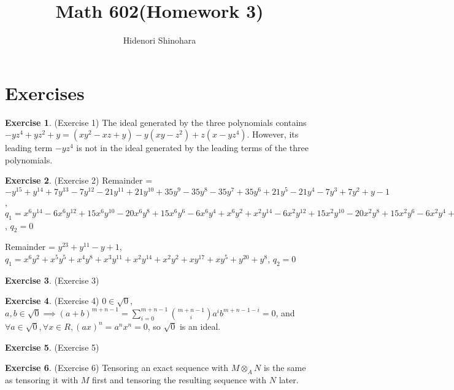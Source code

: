 \documentclass[12pt, psamsfonts]{amsart}
\theoremstyle{definition}
\newtheorem*{exer}{Exercise}
\theoremstyle{remark}
\numberwithin{equation}{section}
\begin{document}
\title{Math 602(Homework 3)}
\author{Hidenori Shinohara}
\maketitle

\section{Exercises}

\begin{exer}{(Exercise 1)}
  The ideal generated by the three polynomials contains $-yz^4 + yz^2 + y = (xy^2 - xz + y) - y(xy - z^2) + z(x - yz^4)$.
  However, its leading term $-yz^4$ is not in the ideal generated by the leading terms of the three polynomials. 
\end{exer}

\begin{exer}{(Exercise 2)}
Remainder = $-y^{15} + y^{14} + 7 y^{13} - 7 y^{12} - 21 y^{11} + 21 y^{10} + 35 y^{9} - 35 y^{8} - 35 y^{7} + 35 y^{6} + 21 y^{5} - 21 y^{4} - 7 y^{3} + 7 y^{2} + y - 1$,
$q_1 = x^{6}y^{14} - 6 x^{6}y^{12} + 15 x^{6}y^{10} - 20 x^{6}y^{8} + 15 x^{6}y^{6} - 6 x^{6}y^{4} + x^{6}y^{2} + x^{2}y^{14} - 6 x^{2}y^{12} + 15 x^{2}y^{10} - 20 x^{2}y^{8} + 15 x^{2}y^{6} - 6 x^{2}y^{4} + x^{2}y^{2}$,
$q_2 = 0$
 
Remainder = $y^{23} + y^{11} - y + 1$,
$q_1 = x^{6}y^{2} + x^{5}y^{5} + x^{4}y^{8} + x^{3}y^{11} + x^{2}y^{14} + x^{2}y^{2} + xy^{17} + xy^{5} + y^{20} + y^{8}$,
$q_2 = 0$
\end{exer}

\begin{exer}{(Exercise 3)}
\end{exer}

\begin{exer}{(Exercise 4)}
  $0 \in \sqrt{0}$, $a, b \in \sqrt{0} \implies (a + b)^{m + n - 1} = \sum_{i=0}^{m + n - 1} \binom{m + n - 1}{i} a^ib^{m + n - 1 - i} = 0$, and $\forall a \in \sqrt{0}, \forall x \in R, (ax)^n = a^nx^n = 0$, so $\sqrt{0}$ is an ideal.
\end{exer}

\begin{exer}{(Exercise 5)}
\end{exer}

\begin{exer}{(Exercise 6)}
  Tensoring an exact sequence with $M \otimes_A N$ is the same as tensoring it with $M$ first and tensoring the resulting sequence with $N$ later.
\end{exer}
\end{document}
